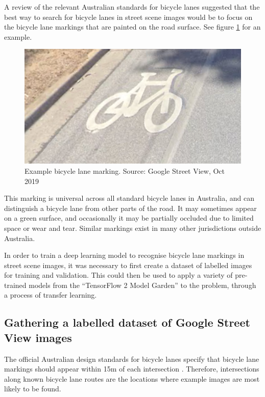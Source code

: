\documentclass[11pt,twoside]{report}
\begin{document}
A review of the relevant Australian standards for bicycle lanes \cite{standards} suggested that the best way to search for bicycle lanes in street scene images would be to focus on the bicycle lane markings that are painted on the road surface.  See figure \ref{fig:symbol} for an example.  

\begin{figure}[h]
\centering
\includegraphics{f001_symbol.png}
\caption{Example bicycle lane marking.  Source: Google Street View, Oct 2019}
\label{fig:symbol}
\end{figure}

This marking is universal across all standard bicycle lanes in Australia, and can distinguish a bicycle lane from other parts of the road.  It may sometimes appear on a green surface, and occasionally it may be partially occluded due to limited space or wear and tear.  Similar markings exist in many other jurisdictions outside Australia.

In order to train a deep learning model to recognise bicycle lane markings in street scene images, it was necessary to first create a dataset of labelled images for training and validation.  This could then be used to apply a variety of pre-trained models from the ``TensorFlow 2 Model Garden'' to the problem, through a process of transfer learning.

\subsection{Gathering a labelled dataset of Google Street View images}

The official Australian design standards for bicycle lanes specify that bicycle lane markings should appear within 15m of each intersection \cite{standards}.  Therefore, intersections along known bicycle lane routes are the locations where example images are most likely to be found.
\end{document}
